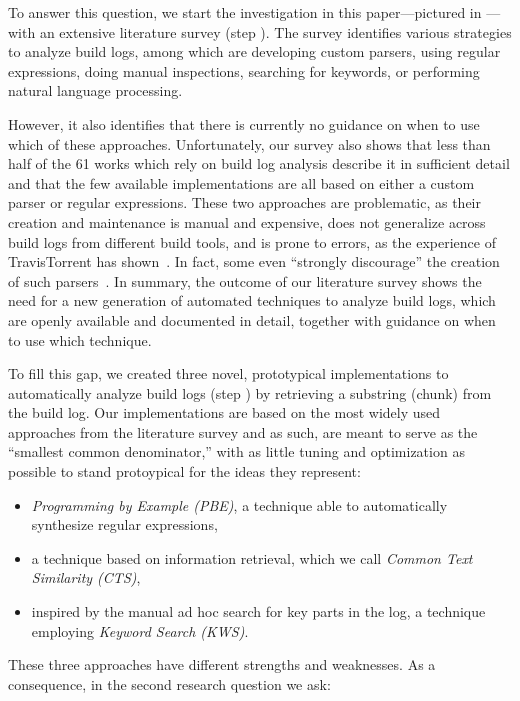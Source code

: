 To answer this question, we start the investigation in this
paper---pictured in
---with an
extensive literature survey (step ).
The survey identifies various strategies to
analyze build logs, among which are developing
custom parsers, using regular expressions, doing manual inspections,
searching for keywords, or performing natural language processing.

However, it also identifies that there is currently no guidance on when
to use which of these
approaches.
Unfortunately, our survey also shows that
less than half of the 61 works which rely on build log analysis
describe it in sufficient detail and that
the few available implementations are all based on either a custom parser
or regular expressions.
These two approaches are problematic, as their creation
and maintenance is manual and expensive, does not generalize across build
logs from different build tools, and is prone to errors,
as the experience of
TravisTorrent has
shown~\cite{beller2017travistorrent,travistorrentquestions}.
In fact, some even ``strongly discourage'' the creation of such
parsers~\cite{urli2018design}.
In summary, the outcome of our literature survey shows the need for a new
generation of automated techniques to analyze build logs, which are
openly available and documented in detail, together with
guidance on when to use which technique.

To fill this gap, we created three novel, prototypical implementations
to automatically analyze build logs (step ) by retrieving
a substring (chunk)
from the build log.
Our
implementations are based on the most widely used approaches
from the literature survey and as such, are meant to serve as
the ``smallest common denominator,'' with as little tuning and
optimization as possible to stand protoypical for the ideas they
represent:
\begin{itemize}
	\item \emph{Programming by Example (PBE)}, a technique
	able to
	automatically synthesize regular expressions,
	\item a technique based on information
	retrieval, which we call \emph{Common Text Similarity (CTS)},
	\item inspired by the manual ad hoc search for key parts in the
	log, a
	technique employing \emph{Keyword Search (KWS)}.
\end{itemize}

These three approaches have
different strengths and weaknesses.
As a consequence,
in the second research question we ask:


